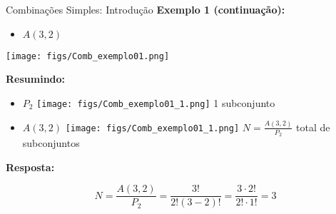 \documentclass[aspectratio=169]{beamer}
\begin{document}
\begin{frame}{Combinações Simples: Introdução}
    \textbf{Exemplo 1 (continuação):} 

    \begin{itemize} 
        \item[] $A(3,2)$
    \end{itemize}

    \begin{center}
        \texttt{[image: figs/Comb\_exemplo01.png]}
    \end{center}

    \pause
    \vspace{2mm}

    \textbf{Resumindo:}

    \begin{itemize}
        \item[] $P_2$ \hspace{1cm} \texttt{[image: figs/Comb\_exemplo01\_1.png]} \hspace{1cm} 1 subconjunto \pause
        \item[] $A(3,2)$ \hspace{0.3cm} \texttt{[image: figs/Comb\_exemplo01\_1.png]} \hspace{1cm} $N = \frac{A(3,2)}{P_2}$ total de subconjuntos \pause
    \end{itemize}

    \vspace{2mm}

    \textbf{Resposta:}

    $$ N = \frac{A(3,2)}{P_2} = \frac{3!}{2! (3-2)!} = \frac{3 \cdot 2!}{2! \cdot 1!} = 3$$


\end{frame}
\end{document}
